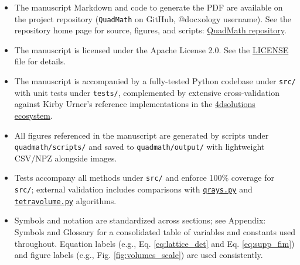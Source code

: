 \documentclass[
]{article}
\providecommand{\tightlist}{%
  \setlength{\itemsep}{0pt}\setlength{\parskip}{0pt}}
\begin{document}
\begin{itemize}
\tightlist
\item
  The manuscript Markdown and code to generate the PDF are available on
  the project repository (\texttt{QuadMath} on GitHub, @docxology
  username). See the repository home page for source, figures, and
  scripts: \href{https://github.com/docxology/quadmath}{QuadMath
  repository}.
\item
  The manuscript is licensed under the Apache License 2.0. See the
  \href{../LICENSE}{LICENSE} file for details.
\item
  The manuscript is accompanied by a fully-tested Python codebase under
  \texttt{src/} with unit tests under \texttt{tests/}, complemented by
  extensive cross-validation against Kirby Urner's reference
  implementations in the
  \href{https://github.com/4dsolutions}{4dsolutions ecosystem}.
\item
  All figures referenced in the manuscript are generated by scripts
  under \texttt{quadmath/scripts/} and saved to
  \texttt{quadmath/output/} with lightweight CSV/NPZ alongside images.
\item
  Tests accompany all methods under \texttt{src/} and enforce 100\%
  coverage for \texttt{src/}; external validation includes comparisons
  with
  \href{https://github.com/4dsolutions/m4w/blob/main/qrays.py}{\texttt{qrays.py}}
  and
  \href{https://github.com/4dsolutions/m4w/blob/main/tetravolume.py}{\texttt{tetravolume.py}}
  algorithms.
\item
  Symbols and notation are standardized across sections; see Appendix:
  Symbols and Glossary for a consolidated table of variables and
  constants used throughout. Equation labels (e.g., Eq.
  \eqref{eq:lattice_det} and Eq. \eqref{eq:supp_fim}) and figure labels
  (e.g., Fig. \ref{fig:volumes_scale}) are used consistently.
\end{itemize}
\end{document}
